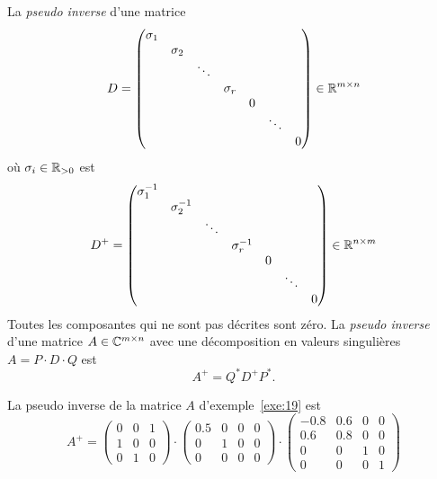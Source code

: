 \begin{definition}
  La \emph{pseudo inverse} d'une matrice 
  \begin{displaymath}
    D =
    \begin{pmatrix}
      \sigma_1 \\
      & \sigma_2 \\
      & & \ddots \\
      & & & \sigma_r \\
      & & & & 0 \\
      & & & & & \ddots  \\
      & & & & & & 0  \\      
    \end{pmatrix}
    \in \mathbb{R}^{m \times n}
  \end{displaymath}
où $\sigma_i \in \mathbb{R}_{>0}$ est 
\begin{displaymath}
  D^+ =  \begin{pmatrix}
      \sigma_1^{-1} \\
      & \sigma_2^{-1} \\
      & & \ddots \\
      & & & \sigma_r^{-1} \\
      & & & & 0 \\
      & & & & & \ddots  \\
      & & & & & & 0  \\      
    \end{pmatrix}
    \in \mathbb{R}^{n \times m}
\end{displaymath}
Toutes les composantes qui ne sont pas décrites sont zéro. 
La \emph{pseudo inverse} d'une matrice $A \in \mathbb{C}^{m \times n}$ avec une décomposition en valeurs singulières $A = P \cdot D \cdot Q$ est 
\begin{displaymath}
  A^+ = Q^* D^+ P^*. 
\end{displaymath}

\end{definition}


\begin{example}
  La pseudo inverse de la matrice $A$ d'exemple~\ref{exe:19} est 
  \begin{displaymath}
    A^+ = 
\begin{pmatrix}0 & 0 & 1\\1 & 0 & 0\\0 & 1 & 0\end{pmatrix} \cdot 
\begin{pmatrix}0.5 & 0 & 0 & 0\\0 & 1 & 0 & 0\\0 & 0 & 0 & 0\end{pmatrix}
\cdot
\begin{pmatrix}-0.8 & 0.6 & 0 & 0\\0.6 & 0.8 & 0 & 0\\0 & 0 & 1 & 0\\0 & 0 & 0 & 1\end{pmatrix} 
  \end{displaymath}
\end{example}

